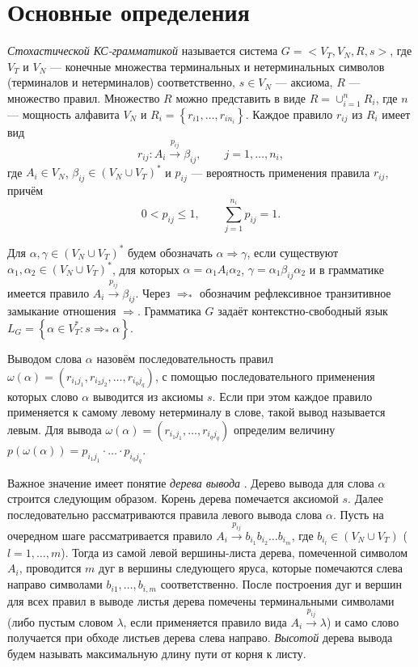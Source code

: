 \documentclass[12pt]{article}
\renewcommand{\leq}{\leqslant}
\begin{document}
\section{Основные определения}

\textit{Стохастической КС-грамматикой} \cite{fu-struct} называется система $G = <V_T, V_N, R, s>$, где $V_T$ и $V_N$ --- конечные множества терминальных и нетерминальных символов (терминалов и нетерминалов) соответственно, $s \in V_N$ --- аксиома, $R$ --- множество правил. Множество $R$ можно представить в виде $R = \cup_{i = 1}^n R_i$, где $n$ --- мощность алфавита $V_N$ и $R_i = \left\{r_{i1}, \ldots, r_{i n_i}\right\}$. Каждое правило $r_{ij}$ из $R_i$ имеет вид
\begin{equation}
	r_{ij} : A_i \xrightarrow{p_{ij}} \beta_{ij},\qquad j = 1, \ldots, n_i,
\end{equation}
где $A_i \in V_N$, $\beta_{ij} \in (V_N \cup V_T)^*$ и $p_{ij}$ --- вероятность применения правила $r_{ij}$, причём
\begin{equation}
\label{eq:p_values}
	0 < p_{ij} \leq 1,\qquad \sum_{j = 1}^{n_i} p_{ij} = 1.
\end{equation}

Для $\alpha, \gamma \in (V_N \cup V_T)^*$ будем обозначать $\alpha \Rightarrow \gamma$, если существуют $\alpha_1, \alpha_2 \in (V_N \cup V_T)^*$, для которых $\alpha = \alpha_1 A_i \alpha_2$, $\gamma = \alpha_1 \beta_{ij} \alpha_2$ и в грамматике имеется правило $A_i \xrightarrow{p_{ij}} \beta_{ij}$. Через $\Rightarrow_*$ обозначим рефлексивное транзитивное замыкание отношения $\Rightarrow$. Грамматика $G$ задаёт контекстно-свободный язык $L_G = \left\{ \alpha \in V_T^* : s \Rightarrow_* \alpha\right\}$.

Выводом слова $\alpha$ назовём последовательность правил $\omega(\alpha) = (r_{i_1 j_1}, r_{i_2 j_2}, \ldots, r_{i_q j_q})$, с помощью последовательного применения которых слово $\alpha$ выводится из аксиомы $s$. Если при этом каждое правило применяется к самому левому нетерминалу в слове, такой вывод называется левым. Для вывода $\omega(\alpha) = (r_{i_1 j_1}, \ldots, r_{i_q j_q})$ определим величину $p(\omega(\alpha)) = p_{i_1 j_1} \cdot \ldots \cdot p_{i_q j_q}$.

Важное значение имеет понятие \textit{дерева вывода} \cite{aho-ulman-syntax}. Дерево вывода для слова $\alpha$ строится следующим образом. Корень дерева помечается аксиомой $s$. Далее последовательно рассматриваются правила левого вывода слова $\alpha$. Пусть на очередном шаге рассматривается правило $A_i \xrightarrow{p_{ij}} b_{i_1} b_{i_2} \ldots b_{i_m}$, где $b_{i_l} \in (V_N \cup V_T)$ ($l = 1,\ldots,m$). Тогда из самой левой вершины-листа дерева, помеченной символом $A_i$, проводится $m$ дуг в вершины следующего яруса, которые помечаются слева направо символами $b_{i1}, \ldots, b_{i,m}$ соответственно. После построения дуг и вершин для всех правил в выводе листья дерева помечены терминальными символами (либо пустым словом $\lambda$, если применяется правило вида $A_i \xrightarrow{p_{ij}} \lambda$) и само слово получается при обходе листьев дерева слева направо. \textit{Высотой} дерева вывода будем называть максимальную длину пути от корня к листу.
\end{document}
